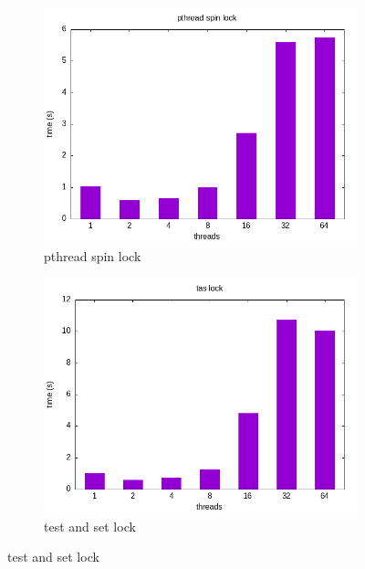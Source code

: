 \documentclass{article}
\newcommand{\eng}[1]{#1}
\begin{document}
\begin{figure}[ht]
\begin{subfigure}{0.45\textwidth}
        \includegraphics[width=\textwidth]{a3/plots/pthread_spin_lock.png}
        \caption{\eng{pthread spin lock}}
        \label{fig:spin}
    \end{subfigure}
    \begin{subfigure}{0.45\textwidth}
        \includegraphics[width=\textwidth]{a3/plots/tas_lock.png}
        \caption{\eng{test and set lock}}
        \label{fig:tas}
    \end{subfigure}
\end{figure}
\end{document}
